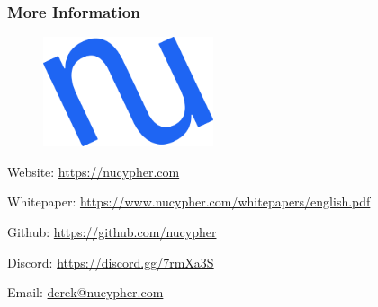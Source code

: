 \documentclass[xetex,mathsans,sans]{beamer}
\begin{document}
    \begin{frame}
        \frametitle{More Information}
        \begin{figure}
            \centering
            \includegraphics[width=5cm]{pdf/nucypher_logo.pdf}
        \end{figure}
        Website: \url{https://nucypher.com}

        Whitepaper: \url{https://www.nucypher.com/whitepapers/english.pdf}

        Github: \url{https://github.com/nucypher}

        Discord: \url{https://discord.gg/7rmXa3S}

        Email: \href{mailto:derek@nucypher.com}{derek@nucypher.com}
    \end{frame}
\end{document}
